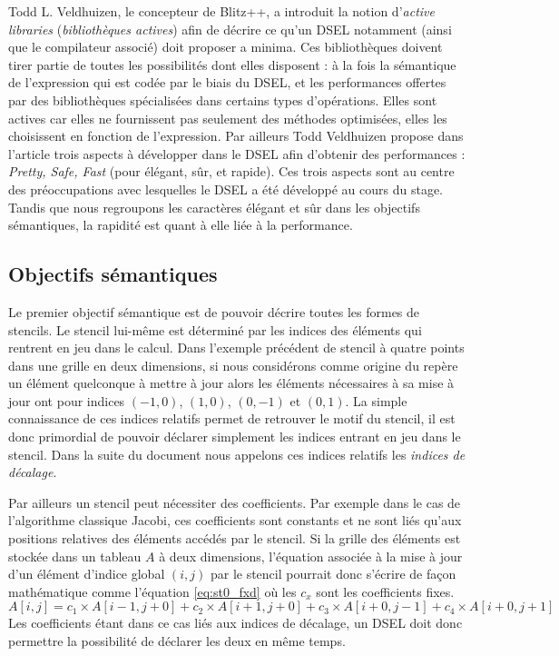 Todd L. Veldhuizen, le concepteur de \textsf{Blitz++}, a introduit la notion d'\emph{active libraries} (\emph{bibliothèques actives}) \cite{Art20} afin de décrire ce qu'un DSEL notamment (ainsi que le compilateur associé) doit proposer a minima. Ces bibliothèques doivent tirer partie de toutes les possibilités dont elles disposent : à la fois la sémantique de l'expression qui est codée par le biais du DSEL, et les performances offertes par des bibliothèques spécialisées dans certains types d'opérations. Elles sont actives car elles ne fournissent pas seulement des méthodes optimisées, elles les choisissent en fonction de l'expression. Par ailleurs Todd Veldhuizen propose dans l'article \cite{Art22} trois aspects à développer dans le DSEL afin d'obtenir des performances : \emph{Pretty, Safe, Fast} (pour élégant, sûr, et rapide). Ces trois aspects sont au centre des préoccupations avec lesquelles le DSEL a été développé au cours du stage. Tandis que nous regroupons les caractères élégant et sûr dans les objectifs sémantiques, la rapidité est quant à elle liée à la performance.

\subsection{Objectifs sémantiques}
\label{sec:obj_sem}

Le premier objectif sémantique est de pouvoir décrire toutes les formes de stencils. Le stencil lui-même est déterminé par les indices des éléments qui rentrent en jeu dans le calcul. Dans l'exemple précédent de stencil à quatre points dans une grille en deux dimensions, si nous considérons comme origine du repère un élément quelconque à mettre à jour alors les éléments nécessaires à sa mise à jour ont pour indices $(-1,0)$, $(1,0)$, $(0,-1)$ et $(0,1)$. La simple connaissance de ces indices relatifs permet de retrouver le motif du stencil, il est donc primordial de pouvoir déclarer simplement les indices entrant en jeu dans le stencil. Dans la suite du document nous appelons ces indices relatifs les \emph{indices de décalage}.

Par ailleurs un stencil peut nécessiter des coefficients. Par exemple dans le cas de l'algorithme classique Jacobi, ces coefficients sont constants et ne sont liés qu'aux positions relatives des éléments accédés par le stencil. Si la grille des éléments est stockée dans un tableau $A$ à deux dimensions, l'équation associée à la mise à jour d'un élément d'indice global $(i,j)$ par le stencil pourrait donc s'écrire de façon mathématique comme l'équation \ref{eq:st0_fxd} où les $c_x$ sont les coefficients fixes.
\begin{equation}
\label{eq:st0_fxd}
A[i,j] = c_1 \times A[i-1,j+0] + c_2 \times A[i+1,j+0] + c_3 \times A[i+0,j-1] + c_4 \times A[i+0,j+1]
\end{equation}
Les coefficients étant dans ce cas liés aux indices de décalage, un DSEL doit donc permettre la possibilité de déclarer les deux en même temps.

